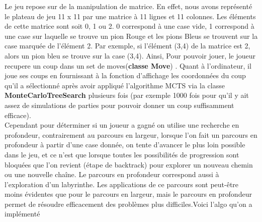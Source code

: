 \documentclass[12pt]{article}
\begin{document}
Le jeu repose sur de la manipulation de matrice. En eﬀet, nous avons représenté le plateau de jeu 11 x 11 par une matrice à 11 lignes et 11 colonnes. Les éléments de cette matrice sont soit 0, 1 ou 2. 0 correspond à une case vide, 1 correspond à une case sur laquelle se trouve un pion Rouge et les pions Bleus se trouvent sur la case marquée de l’élément 2. Par exemple, si l’élément (3,4) de la matrice est 2, alors un pion bleu se trouve sur la case (3,4). Ainsi, Pour pouvoir jouer, le joueur recupere un coup dans un set de moves(\textbf{classe Move}) . Quant à l’ordinateur, il joue ses coups en fournissant à la fonction d’aﬃchage les coordonnées du coup qu’il a sélectionné après avoir appliqué l’algorithme MCTS via la classe \textbf{MonteCarloTreeSearch} plusieurs fois (par exemple 1000 fois pour qu’il y ait assez de simulations de parties pour pouvoir donner un coup suﬃsamment eﬃcace).
\\
Cependant pour déterminer si un joueur a gagné on utilise une recherche en profondeur, contrairement au parcours en largeur, lorsque l’on fait un parcours en profondeur à partir d’une case donnée, on tente d’avancer le plus loin possible dans le jeu, et ce n’est que lorsque toutes les possibilités de progression sont bloquées que l’on revient (étape de backtrack) pour explorer un nouveau chemin ou une nouvelle chaîne. Le parcours en profondeur correspond aussi à l’exploration d’un labyrinthe. Les applications de ce parcours sont peut-être moins évidentes que pour le parcours en largeur, mais le parcours en profondeur permet de résoudre efficacement des problèmes plus difficiles.Voici l'algo qu'on a implémenté
\end{document}
